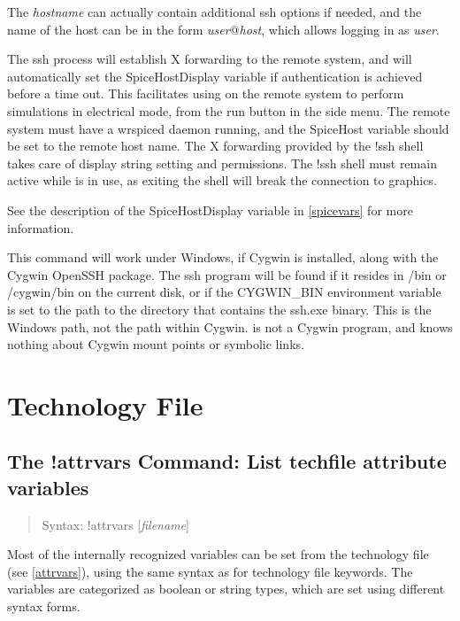 The {\it hostname} can actually contain additional {\vt ssh} options
if needed, and the name of the host can be in the form {\it
user\/}{\vt @}{\it host\/}, which allows logging in as {\it user\/}.
 
The {\vt ssh} process will establish X forwarding to the remote
system, and will automatically set the {\et SpiceHostDisplay} variable
if authentication is achieved before a time out.  This facilitates
using {\WRspice} on the remote system to perform simulations in
electrical mode, from the {\cb run} button in the side menu.  The
remote system must have a {\vt wrspiced} daemon running, and the {\et
SpiceHost} variable should be set to the remote host name.  The X
forwarding provided by the {\cb !ssh} shell takes care of display
string setting and permissions.  The {\cb !ssh} shell must remain
active while {\WRspice} is in use, as exiting the shell will break the
connection to {\WRspice} graphics.
 
See the description of the {\et SpiceHostDisplay} variable in
\ref{spicevars} for more information.
 
This command will work under Windows, if Cygwin is installed, along
with the Cygwin OpenSSH package.  The {\vt ssh} program will be found
if it resides in {\vt /bin} or {\vt /cygwin/bin} on the current disk,
or if the {\et CYGWIN\_BIN} environment variable is set to the path to
the directory that contains the {\vt ssh.exe} binary.  This is the
Windows path, not the path within Cygwin.  {\Xic} is not a Cygwin
program, and knows nothing about Cygwin mount points or symbolic
links.

\section{Technology File}

\subsection{The {\cb !attrvars} Command: List techfile attribute variables}
\begin{quote}
Syntax: {\vt !attrvars} [{\it filename\/}]
\end{quote}
Most of the internally recognized variables can be set from the
technology file (see \ref{attrvars}), using the same syntax as for
technology file keywords.  The variables are categorized as boolean or
string types, which are set using different syntax forms.

